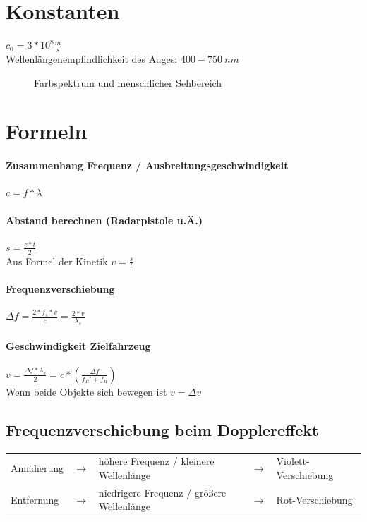 \documentclass[12pt, a4paper]{scrreprt}
\begin{document}
\section{Konstanten}
\(c_0 = 3*10^8\frac{m}{s}\)\\[1em]
\textcolor{myred}{Wellenlängenempfindlichkeit des Auges:} \(400 - 750\ nm\)\\

\begin{figure}[H]
  \centering
  
  \caption[Farbspektrum]{Farbspektrum und menschlicher Sehbereich}
  \label{fig:Spektrum}
\end{figure}

\section{Formeln}
\paragraph{Zusammenhang Frequenz / Ausbreitungsgeschwindigkeit} \dotfill \(c = f * \lambda\)
\paragraph{Abstand berechnen (Radarpistole u.Ä.)} \dotfill \(s = \frac{c * t}{2}\)\\
\myhspace \textcolor{myred}{Aus Formel der Kinetik \(v = \frac{s}{t}\)}
\paragraph{Frequenzverschiebung} \dotfill \(\Delta f = \frac{2 * f_s * v}{c} = \frac{2 * v}{\lambda_s}\)
\paragraph{Geschwindigkeit Zielfahrzeug} \dotfill \(v = \frac{\Delta f * \lambda_s}{2} = c * \left( \frac{\Delta f}{f_R'+f_R} \right) \)\\
\myhspace\textcolor{myred}{Wenn beide Objekte sich bewegen ist \(v = \Delta v\)}

\subsection*{Frequenzverschiebung beim Dopplereffekt}

\begin{framed}
  \textcolor{myred}{
    \begin{tabular}[h]{lclcl}
    Annäherung & $\rightarrow$ & höhere Frequenz / kleinere Wellenlänge & $\rightarrow$ & Violett-Verschiebung\\ 
    Entfernung & $\rightarrow$ & niedrigere Frequenz / größere Wellenlänge & $\rightarrow$ & Rot-Verschiebung
    \end{tabular}
  }
\end{framed}
\end{document}

